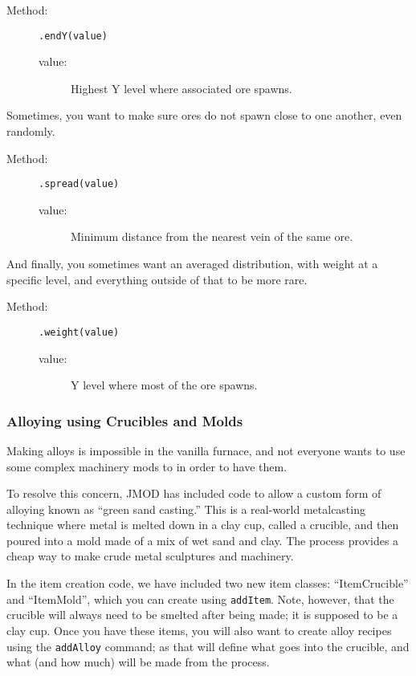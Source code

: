 \documentclass[letterpaper,titlepage,12pt]{article}
\begin{document}
\begin{description}
\item[Method:] \texttt{.endY(value)}
\begin{description}
\item [value:] Highest Y level where associated ore spawns.
\end{description}
\end{description}

Sometimes, you want to make sure ores do not spawn close to one another, even randomly.

\begin{description}
\item[Method:] \texttt{.spread(value)}
\begin{description}
\item [value:] Minimum distance from the nearest vein of the same ore.
\end{description}
\end{description}

And finally, you sometimes want an averaged distribution, with weight at a specific level, and everything outside of that to be more rare.

\begin{description}
\item[Method:] \texttt{.weight(value)}
\begin{description}
\item [value:] Y level where most of the ore spawns.
\end{description}
\end{description}

\subsubsection{Alloying using Crucibles and Molds}

Making alloys is impossible in the vanilla furnace, and not everyone wants to use some complex machinery mods to in order to have them.

To resolve this concern, JMOD has included code to allow a custom form of alloying known as ``green sand casting.''  This is a real-world metalcasting technique where metal is melted down in a clay cup, called a crucible, and then poured into a mold made of a mix of wet sand and clay.  The process provides a cheap way to make crude metal sculptures and machinery.

In the item creation code, we have included two new item classes: ``ItemCrucible'' and ``ItemMold'', which you can create using \texttt{addItem}.  Note, however, that the crucible will always need to be smelted after being made; it is supposed to be a clay cup.  Once you have these items, you will also want to create alloy recipes using the \texttt{addAlloy} command; as that will define what goes into the crucible, and what (and how much) will be made from the process.
\end{document}
